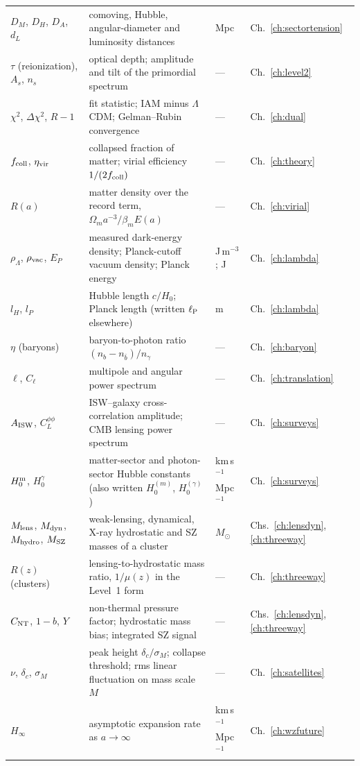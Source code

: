 {\begin{longtable}{@{}>{\raggedright\arraybackslash}p{}>{\raggedright\arraybackslash}p{}>{\raggedright\arraybackslash}p{}>{\raggedright\arraybackslash}p{}@{}}
$D_M$, $D_H$, $D_A$, $d_L$ & comoving, Hubble, angular-diameter and luminosity distances & Mpc & Ch.~\ref{ch:sectortension}\\\iamrowrule
$\tau$ (reionization), $A_s$, $n_s$ & optical depth; amplitude and tilt of the primordial spectrum & --- & Ch.~\ref{ch:level2}\\\iamrowrule
$\chi^2$, $\Delta\chi^2$, $R-1$ & fit statistic; IAM minus $\Lambda$CDM; Gelman--Rubin convergence & --- & Ch.~\ref{ch:dual}\\\iamrowrule
$f_{\rm coll}$, $\eta_{\rm vir}$ & collapsed fraction of matter; virial efficiency $1/(2f_{\rm coll})$ & --- & Ch.~\ref{ch:theory}\\\iamrowrule
$R(a)$ & matter density over the record term, $\Omega_ma^{-3}/\beta_mE(a)$ & --- & Ch.~\ref{ch:virial}\\\iamrowrule
$\rho_\Lambda$, $\rho_{\rm vac}$, $E_P$ & measured dark-energy density; Planck-cutoff vacuum density; Planck energy & J\,m$^{-3}$; J & Ch.~\ref{ch:lambda}\\\iamrowrule
$l_H$, $l_P$ & Hubble length $c/H_0$; Planck length (written $\ell_{\mathrm P}$ elsewhere) & m & Ch.~\ref{ch:lambda}\\\iamrowrule
$\eta$ (baryons) & baryon-to-photon ratio $(n_b-n_{\bar b})/n_\gamma$ & --- & Ch.~\ref{ch:baryon}\\\iamrowrule
$\ell$, $C_\ell$ & multipole and angular power spectrum & --- & Ch.~\ref{ch:translation}\\\iamrowrule
$A_{\rm ISW}$, $C_L^{\phi\phi}$ & ISW--galaxy cross-correlation amplitude; CMB lensing power spectrum & --- & Ch.~\ref{ch:surveys}\\\iamrowrule
$H_0^{\rm m}$, $H_0^{\gamma}$ & matter-sector and photon-sector Hubble constants (also written $H_0^{(m)}$, $H_0^{(\gamma)}$) & km\,s$^{-1}$\,Mpc$^{-1}$ & Ch.~\ref{ch:surveys}\\\iamrowrule
$M_{\rm lens}$, $M_{\rm dyn}$, $M_{\rm hydro}$, $M_{\rm SZ}$ & weak-lensing, dynamical, X-ray hydrostatic and SZ masses of a cluster & $M_\odot$ & Chs.~\ref{ch:lensdyn}, \ref{ch:threeway}\\\iamrowrule
$R(z)$ (clusters) & lensing-to-hydrostatic mass ratio, $1/\mu(z)$ in the Level~1 form & --- & Ch.~\ref{ch:threeway}\\\iamrowrule
$C_{\rm NT}$, $1-b$, $Y$ & non-thermal pressure factor; hydrostatic mass bias; integrated SZ signal & --- & Chs.~\ref{ch:lensdyn}, \ref{ch:threeway}\\\iamrowrule
$\nu$, $\delta_c$, $\sigma_M$ & peak height $\delta_c/\sigma_M$; collapse threshold; rms linear fluctuation on mass scale $M$ & --- & Ch.~\ref{ch:satellites}\\\iamrowrule
$H_\infty$ & asymptotic expansion rate as $a\to\infty$ & km\,s$^{-1}$\,Mpc$^{-1}$ & Ch.~\ref{ch:wzfuture}\\
\bottomrule\end{longtable}}
